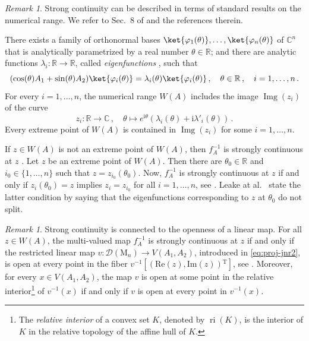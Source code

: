 \documentclass[a4paper,11pt,reqno]{amsart}
\newcommand{\C}{\mathbb{C}}
\newcommand{\R}{\mathbb{R}}
\newcommand{\M}{\mathrm{M}}
\newcommand{\cD}{\mathcal{D}}
\newcommand{\ii}{\mathrm{i}}
\renewcommand\Im{\mathrm{Im}}
\renewcommand\Re{\mathrm{Re}}
\newcommand{\tp}{{}^\mathrm{T}}
\DeclareMathOperator\Img{Img}
\DeclareMathOperator\ri{ri}
\theoremstyle{definition}
\theoremstyle{remark}
\newtheorem{rem}[thm]{Remark}
\numberwithin{equation}{section}
\begin{document}
\begin{rem}\label{rem:eigenfunctions}
Strong continuity can be described in terms of standard results on the 
numerical range. We refer to Sec.~8 of \cite{Leake-etal2014-preimages} 
and the references therein. 
\par
%
There exists a family of orthonormal bases 
$\ket{\varphi_1(\theta)},\dots,\ket{\varphi_n(\theta)}$ of $\C^n$ that is analytically 
parametrized by a real number $\theta\in\R$; and there are analytic functions 
$\lambda_i:\R\to\R$, called \emph{eigenfunctions} \cite{Leake-etal2014-inverse}, 
such that
\[\textstyle
(\cos(\theta)A_1+\sin(\theta)A_2)\ket{\varphi_i(\theta)}
=\lambda_i(\theta)\ket{\varphi_i(\theta)}\,,
\quad 
\theta\in\R\,,
\quad
i=1,\dots,n\,.
\]
For every $i=1,\ldots,n$, the numerical range $W(A)$ includes the image 
$\Img(z_i)$ of the curve 
\[\textstyle
z_i:\R\to\C\,,
\quad 
\theta\mapsto e^{\ii\theta}(\lambda_i(\theta)+\ii\lambda'_i(\theta))\,.
\]
Every extreme point of $W(A)$ is contained in $\Img(z_i)$ for some 
$i=1,\ldots,n$.
\par
%
If $z\in W(A)$ is not an extreme point of 
$W(A)$, then $f_A^{-1}$ is strongly continuous at $z$
\cite[Thm.~4]{Corey-etal2013}. Let $z$ be an extreme point of $W(A)$. Then 
there are $\theta_0\in\R$ and $i_0\in\{1,\ldots,n\}$ such that 
$z=z_{i_0}(\theta_0)$. Now, $f_A^{-1}$ is strongly continuous at $z$ if and 
only if $z_i(\theta_0)=z$ implies $z_i=z_{i_0}$ for all $i=1,\ldots,n$, see 
\cite[Thm.~2.1.1]{Leake-etal2014-inverse}. 
Leake at al.~\cite{Leake-etal2014-inverse} state the latter condition by 
saying that the eigenfunctions corresponding to $z$ at $\theta_0$ do not split. 
\end{rem}
%
\begin{rem}\label{rem:pi-eigenfunctions}
Strong continuity is connected to the openness of a linear map. For all 
$z\in W(A)$, the multi-valued map $f_A^{-1}$ is strongly continuous at $z$ if 
and only if the restricted linear map $v:\cD(\M_n)\to V(A_1,A_2)$, introduced 
in \eqref{eq:proj-jnr2}, is open at every point in the fiber 
$v^{-1}[(\Re(z),\Im(z))\tp]$, see \cite[Coro.~5.2]{Weis2016}. Moreover, for 
every $x\in V(A_1,A_2)$, the map $v$ is open at some point in the relative 
interior\footnote{%
The \emph{relative interior} \cite{Rockafellar1970} of a convex set $K$, denoted 
by $\ri(K)$, is the interior of $K$ in the relative topology of the affine hull 
of $K$.} 
of $v^{-1}(x)$ if and only if $v$ is open at every point in $v^{-1}(x)$.
\end{rem}
%
\end{document}
